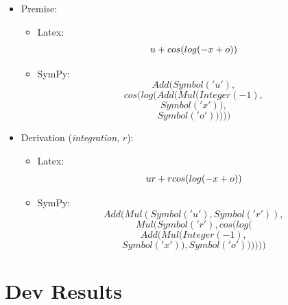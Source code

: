 \documentclass[11pt]{article}
\begin{document}
\begin{itemize}
    \item Premise: 
    \begin{itemize}
            \item Latex: 
            $$u + \\cos{(\\log{(- x + o)})}$$
            \item SymPy: 
            $$Add(Symbol('u'),$$
           $$ cos(log(Add(Mul(Integer(-1),
           $$
           $$Symbol('x')),
           $$
           $$
           Symbol('o'))))) 
            $$
    \end{itemize}
    \item Derivation (\emph{integration}, $r$):
    \begin{itemize}  
            \item Latex: 
            $$u r + r \\cos{(\\log{(- x + o)})}$$
            \item SymPy: 
            $$ 
            Add(Mul(Symbol('u'), Symbol('r')), 
            $$
            $$
            Mul(Symbol('r'), cos(log(
            $$
            $$
            Add(Mul(Integer(-1), 
            $$
            $$
            Symbol('x')), Symbol('o'))))))
            $$
    \end{itemize}
\end{itemize}

\section{Dev Results}
\end{document}

